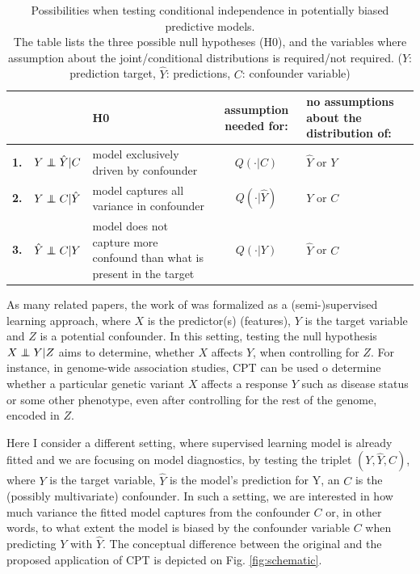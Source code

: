 \documentclass{article}
\begin{document}
\renewcommand{\arraystretch}{2}
\begin{table}[]
\centering
\begin{tabular}{l|rp{60mm}|c|>{\centering\arraybackslash}m{30mm}}
 &  & H0  & assumption needed for: & no assumptions about the distribution of: \\
\hline
\textbf{1.} & $Y \independent \hat{Y} | C$ \quad  & model exclusively driven by confounder & $Q(\cdot|C)$ & $\hat{Y}$ or $Y$ \\
\textbf{2.} & $Y \independent C | \hat{Y}$ \quad & model captures all variance in confounder & $Q(\cdot|\hat{Y})$ & $Y$ or $C$ \\
\textbf{3.} & $\hat{Y} \independent C | Y$  \quad &  model does not capture more confound than what is present in the target & $Q(\cdot|Y)$ & $\hat{Y}$ or $C$ \\
\end{tabular}
\caption{\label{tab:conditional-independence-cases} Possibilities when testing conditional independence in potentially biased predictive models. \\The table lists the three possible null hypotheses (H0), and the variables where assumption about the joint/conditional distributions is required/not required.   ($Y$: prediction target, $\hat{Y}$: predictions, $C$: confounder variable) }
\end{table}

As many related papers, the work of \cite{berrett2020conditional} was formalized as a (semi-)supervised learning approach, where $X$ is the predictor(s) (features), $Y$ is the target variable and $Z$ is a potential confounder. In this setting, testing the null hypothesis $X \independent Y | Z$ aims to determine, whether $X$ affects $Y$, when controlling for $Z$.
For instance, in genome-wide association studies, CPT can be used o determine whether a particular genetic variant $X$ affects a response $Y$ such as disease status or some other phenotype, even after controlling for the rest of the genome, encoded in $Z$.

Here I consider a different setting, where supervised learning model is already fitted and we are focusing on model diagnostics, by testing the triplet $(Y,\hat{Y}, C)$, where $Y$ is the target variable, $\hat{Y}$ is the model's prediction for Y, an $C$ is the (possibly multivariate) confounder. In such a setting, we are interested in how much variance the fitted model captures from the confounder $C$ or, in other words, to what extent the model is biased by the confounder variable $C$ when predicting $Y$ with $\hat{Y}$. The conceptual difference between the original and the proposed application of CPT is depicted on Fig. \ref{fig:schematic}.
\end{document}
